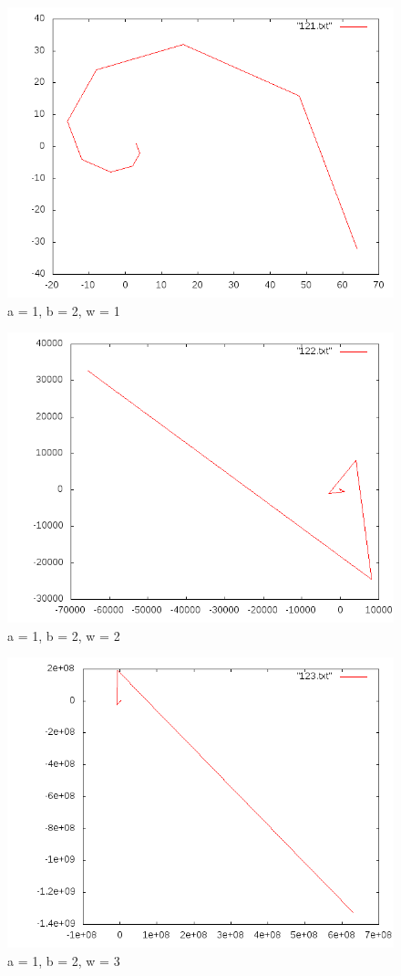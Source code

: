 \documentclass[12pt]{article}
\begin{document}
\begin{figure}[h!]
  \caption{a = 1, b = 2, w = 1}
  \centering
    \includegraphics[scale=0.3]{121.png}
\end{figure}
\begin{figure}[h!]
  \caption{a = 1, b = 2, w = 2}
  \centering
    \includegraphics[scale=0.3]{122.png}
\end{figure}
\begin{figure}[h!]
  \caption{a = 1, b = 2, w = 3}
  \centering
    \includegraphics[scale=0.3]{123.png}
\end{figure}
\end{document}

